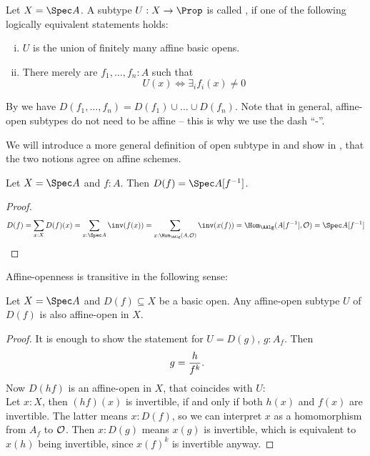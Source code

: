 \begin{definition}%
  \label{affine-open}
  Let $X=\Spec A$.
  A subtype $U:X\to\Prop$ is called ,
  if one of the following logically equivalent statements holds:
  \begin{enumerate}[(i)]%
  \item $U$ is the union of finitely many affine basic opens.
  \item There merely are $f_1,\dots,f_n:A$ such that
    \[U(x) \Leftrightarrow \exists_{i} f_i(x)\neq 0 \]
  \end{enumerate}
\end{definition}

By  we have $D(f_1, \dots, f_n) = D(f_1) \cup \dots \cup D(f_n)$.
Note that in general, affine-open subtypes do not need to be affine
-- this is why we use the dash ``-''.

We will introduce a more general definition of open subtype in 
and show in , that the two notions agree on affine schemes.

\begin{proposition}
  Let $X = \Spec A$ and $f : A$.
  Then $D(f) = \Spec A[f^{-1}]$.
\end{proposition}

\begin{proof}
  \[ D(f) =
     \sum_{x : X} D(f)(x) =
     \sum_{x : \Spec A} \inv(f(x)) =
     \sum_{x : \Hom_{\AAlg}(A, \A)} \inv(x(f)) =
     \Hom_{\AAlg}(A[f^{-1}], \A) =
     \Spec A[f^{-1}]
     \]
\end{proof}

Affine-openness is transitive in the following sense:

\begin{lemma}%
  \label{affine-open-trans}
  Let $X=\Spec A$ and $D(f)\subseteq X$ be a basic open.
  Any affine-open subtype $U$ of $D(f)$ is also affine-open in $X$.
\end{lemma}

\begin{proof}
  It is enough to show the statement for $U=D(g)$, $g:A_f$.
  Then
  \[ g=\frac{h}{f^k}\rlap{.}\]
  Now $D(hf)$ is an affine-open in $X$,
  that coincides with $U$: \\
  Let $x:X$, then $(hf)(x)$ is invertible, if and only if both $h(x)$ and $f(x)$ are invertible.
  The latter means $x:D(f)$, so we can interpret $x$ as a homomorphism from $A_f$ to $\mathcal O$.
  Then $x:D(g)$ means $x(g)$ is invertible, which is equivalent to $x(h)$ being invertible,
  since $x(f)^k$ is invertible anyway.
\end{proof}

